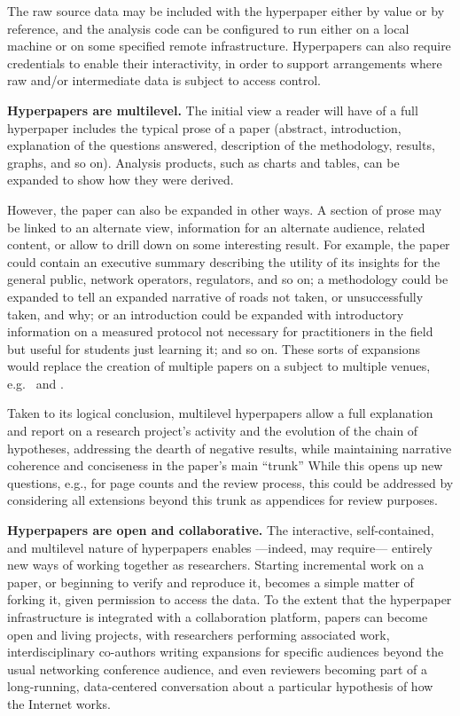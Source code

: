 \documentclass[sigconf,10pt]{acmart}
\begin{document}
The raw source data may be included with the hyperpaper either by value or by
reference, and the analysis code can be configured to run either on a local
machine or on some specified remote infrastructure. Hyperpapers can also require
credentials to enable their interactivity, in order to support arrangements
where raw and/or intermediate data is subject to access control.

\textbf{Hyperpapers are multilevel.} The initial view a reader will have of a
full hyperpaper includes the typical prose of a paper (abstract, introduction,
explanation of the questions answered, description of the methodology, results,
graphs, and so on). Analysis products, such as charts and tables, can be
expanded to show how they were derived.

However, the paper can also be expanded in other ways. A section of prose may
be linked to an alternate view, information for an alternate audience, related
content, or allow to drill down on some interesting result. For example, the
paper could contain an executive summary describing the utility of its insights
for the general public, network operators, regulators, and so on; a methodology
could be expanded to tell an expanded narrative of roads not taken, or
unsuccessfully taken, and why; or an introduction could be expanded with
introductory information on a measured protocol not necessary for practitioners
in the field but useful for students just learning it; and so on.  These sorts
of expansions would replace the creation of multiple papers on a subject to
multiple venues, e.g.~\cite{Dhamdhere18} and \cite{Clark18}.

Taken to its logical conclusion, multilevel hyperpapers allow a full explanation
and report on a research project's activity and the evolution of the chain of
hypotheses, addressing the dearth of negative results, while maintaining
narrative coherence and conciseness in the paper's main ``trunk'' While this
opens up new questions, e.g., for page counts and the review process, this
could be addressed by considering all extensions beyond this trunk as appendices
for review purposes.

\textbf{Hyperpapers are open and collaborative.} The interactive,
self-contained, and multilevel nature of hyperpapers enables ---indeed, may
require--- entirely new ways of working together as researchers. Starting
incremental work on a paper, or beginning to verify and reproduce it, becomes a
simple matter of forking it, given permission to access the data. To the extent
that the hyperpaper infrastructure is integrated with a collaboration platform,
papers can become open and living projects, with researchers performing
associated work, interdisciplinary co-authors writing expansions for specific
audiences beyond the usual networking conference audience, and even reviewers
becoming part of a long-running, data-centered conversation about a particular
hypothesis of how the Internet works.
\end{document}

